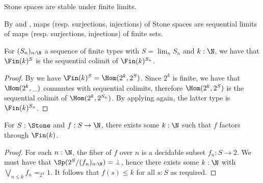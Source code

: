 \begin{corollary}
Stone spaces are stable under finite limits.
\end{corollary}
\begin{remark}\label{StoneClosedUnderPullback}\label{ProFiniteMapsFactorization}
  By  and 
  , maps (resp. surjections, injections) of Stone spaces
  are sequential limits of maps (resp. surjections, injections) of finite sets. 
%
%
%
%
\end{remark}

\begin{lemma}\label{ScottFiniteCodomain}
  For $(S_n)_{n:\N}$ a sequence of finite types with $S=\lim_nS_n$ and $k:\N$, we have that $\Fin(k)^{S}$ is the sequential colimit of $\Fin(k)^{S_n}$.
\end{lemma}
\begin{proof}
  By  we have $\Fin(k)^S = \Hom(2^{k},2^S)$.
  Since $2^{k}$ is finite, we have that $\Hom(2^k,\_)$ commutes with sequential colimits, therefore $\Hom(2^{k},2^S)$ is the sequential colimit of $\Hom(2^{k},2^{S_n})$. 
  By applying  again, %
  the latter type is $\Fin(k)^{S_n}$.%
\end{proof}

\begin{lemma}\label{MapsStoneToNareBounded}
  For $S:\Stone$ and $f:S \to \N$, there exists some $k:\N$ such that $f$ factors through $\Fin(k)$. 
\end{lemma}
\begin{proof}
  For each $n:\N$, the fiber of $f$ over $n$ is a decidable subset $f_n:S \to 2$. 
  We must have that $\Sp(2^S/(f_n)_{n:\N}) = \bot$, hence there exists some $k:\N$ with 
  $\bigvee_{n\leq k} f_n =_{2^S} 1 $. 
  It follows that $f(s)\leq k$ for all $s:S$ as required. 
\end{proof}

